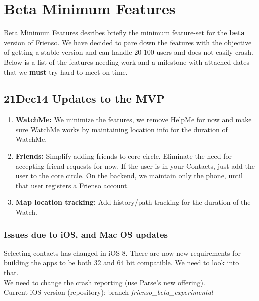 \chapter{Beta Minimum Features}

\begin{introduction}
  Beta Minimum Features desribes briefly the minimum feature-set for the \textbf{beta} version
  of Frienso.  We have decided to pare down the features with the objective of getting a 
  stable version and can handle 20-100 users and does not easily crash. Below is a list of
  the features needing work and a milestone with attached dates that we \textbf{must} try hard
  to meet on time. 
\end{introduction}

\section{21Dec14 Updates to the MVP}

\begin{enumerate}
\item \textbf{WatchMe:}  We minimize the features, we remove HelpMe for now and make sure WatchMe works by maintaining location info for the duration of WatchMe.
\item \textbf{Friends:} Simplify adding friends to core circle. Eliminate the need for accepting friend requests for now. If the user is in your Contacts, just add the user to the core circle.  On the backend, we maintain only the phone, until that user registers a Frienso account.
\item \textbf{Map location tracking:} Add history/path tracking for the duration of the Watch.
\end{enumerate}

\subsection{Issues due to iOS, and Mac OS updates}
Selecting contacts has changed in iOS 8.  There are now new requirements for building the apps to be both 32 and 64 bit compatible. We need to look into that.\\

We need to change the crash reporting (use Parse's new offering). \\

Current iOS version (repository): branch \emph{ frienso\_beta\_experimental} \\

